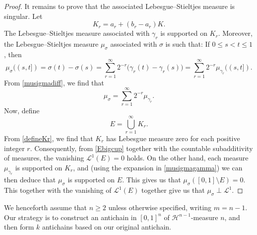 \documentclass{publicadapt}
\begin{document}
\begin{proof}
It remains to prove that the associated Lebesgue--Stieltjes measure is singular. Let
\begin{equation}\label{defineKr} 
K_r=a_r+(b_r-a_r)K.
\end{equation}
The Lebesgue--Stieltjes measure associated with $\gamma_r$ is supported on
 $K_r$. Moreover, 
 the Lebesgue--Stieltjes measure $\mu_\sigma$ associated with
 $\sigma$ is such that: If $0 \leq s < t \leq 1$, then 
\begin{equation}\label{musigmadiff}
 \mu_\sigma((s,t])
=
\sigma(t)-\sigma(s)
=
\sum_{r=1}^{\infty}2^{-r}
\bigl(\gamma_r(t)-\gamma_r(s)\bigr)
=
\sum_{r=1}^{\infty}2^{-r}\mu_{\gamma_r}((s,t]). 
\end{equation}
 From \eqref{musigmadiff}, we find that 
\begin{equation}\label{musigmagamma} 
\mu_\sigma
=
\sum_{r=1}^{\infty}2^{-r}\mu_{\gamma_r}.
\end{equation}
 Now, define 
\begin{equation}\label{Ebigcup}
 E = \bigcup_{r=1}^{\infty}K_r.
\end{equation}
 From \eqref{defineKr}, we find that 
 $K_r$ has Lebesgue measure zero for each positive integer $r$. 
 Consequently, from \eqref{Ebigcup} 
 together with the countable subadditivity of measures, the vanishing 
$ \mathcal L^1(E)=0 
$ holds. On the other hand, each measure \(\mu_{\gamma_r}\) is supported on \(K_r\), and (using the expansion in \eqref{musigmagamma})
 we can then deduce that $\mu_\sigma$ is supported on $E$. This gives us that 
$\mu_\sigma([0,1]\setminus E)=0$. 
 This together with the vanishing of $\mathcal{L}^{1}(E)$ together give us  that $ \mu_\sigma\perp \mathcal L^1$.
\end{proof} 

 We henceforth assume that $n \geq 2$ unless otherwise specified, writing $m = n - 1$. 
 Our strategy is to construct an antichain in $[0, 1]^{n}$ of $\mathcal{H}^{n-1}$-measure $n$, 
 and then form $k$ antichains based on our original antichain. 
\end{document}
